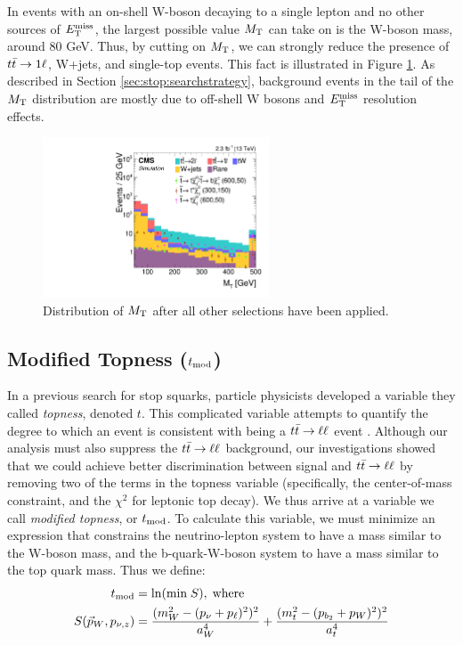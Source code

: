 In events with an on-shell W-boson decaying to a single lepton and no
other sources of $E_\text{T}^\text{miss}$, the largest possible value $M_\text{T}$ can take on
is the W-boson mass, around 80 GeV. Thus, by cutting on $M_\text{T}$, we can
strongly reduce the presence of $t\bar{t} \rightarrow 1\ell$, W+jets, and single-top
events. This fact is illustrated in Figure
\ref{fig:stop:mt:nminusone}. As described in Section
\ref{sec:stop:searchstrategy}, background events in the tail of the
$M_\text{T}$ distribution are mostly due to off-shell W bosons and $E_\text{T}^\text{miss}$
resolution effects.

\begin{figure}[htb]
\centering
\includegraphics[width=0.6\textwidth]{figures/nminusone_mt.pdf}
\caption{Distribution of $M_\text{T}$ after all other selections have been applied.}
\label{fig:stop:mt:nminusone}
\end{figure}

\subsection{Modified Topness (\texorpdfstring{$t_\text{mod}$}{tmod})}
\label{ssec:stop:tmod}

In a previous search for stop squarks, particle physicists developed a
variable they called \emph{topness}, denoted $t$. This complicated
variable attempts to quantify the degree to which an event is
consistent with being a $t\bar{t} \rightarrow \ell\ell$ event \cite{topness}. Although our
analysis must also suppress the $t\bar{t} \rightarrow \ell\ell$ background, our
investigations showed that we could achieve better discrimination
between signal and $t\bar{t} \rightarrow \ell\ell$ by removing two of the terms in the
topness variable (specifically, the center-of-mass constraint, and the
$\chi^2$ for leptonic top decay). We thus arrive at a variable we call
\emph{modified topness}, or $t_\text{mod}$. To calculate this
variable, we must minimize an expression that constrains the
neutrino-lepton system to have a mass similar to the W-boson mass, and the
b-quark-W-boson system to have a mass similar to the top quark mass. Thus
we define:
\begin{equation}
\label{eq:stop:tmod}
\begin{split}
t_\text{mod} & = \ln ( \text{min} \; S ), \; \text{where} \\
S(\vec{p}_W, p_{\nu,z}) & = \frac{(m_W^2-(p_\nu+p_\ell)^2)^2}{a_W^4} + \frac{(m_t^2 - (p_{b_2}+p_W)^2)^2}{a_t^4}
\end{split}
\end{equation}

